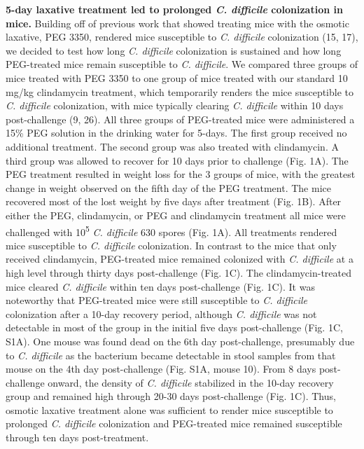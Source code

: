 \documentclass[
  11pt,
]{article}
\begin{document}
\textbf{5-day laxative treatment led to prolonged \emph{C. difficile}
colonization in mice.} Building off of previous work that showed
treating mice with the osmotic laxative, PEG 3350, rendered mice
susceptible to \emph{C. difficile} colonization (15, 17), we decided to
test how long \emph{C. difficile} colonization is sustained and how long
PEG-treated mice remain susceptible to \emph{C. difficile}. We compared
three groups of mice treated with PEG 3350 to one group of mice treated
with our standard 10 mg/kg clindamycin treatment, which temporarily
renders the mice susceptible to \emph{C. difficile} colonization, with
mice typically clearing \emph{C. difficile} within 10 days
post-challenge (9, 26). All three groups of PEG-treated mice were
administered a 15\% PEG solution in the drinking water for 5-days. The
first group received no additional treatment. The second group was also
treated with clindamycin. A third group was allowed to recover for 10
days prior to challenge (Fig. 1A). The PEG treatment resulted in weight
loss for the 3 groups of mice, with the greatest change in weight
observed on the fifth day of the PEG treatment. The mice recovered most
of the lost weight by five days after treatment (Fig. 1B). After either
the PEG, clindamycin, or PEG and clindamycin treatment all mice were
challenged with 10\textsuperscript{5} \emph{C. difficile} 630 spores
(Fig. 1A). All treatments rendered mice susceptible to \emph{C.
difficile} colonization. In contrast to the mice that only received
clindamycin, PEG-treated mice remained colonized with \emph{C.
difficile} at a high level through thirty days post-challenge (Fig. 1C).
The clindamycin-treated mice cleared \emph{C. difficile} within ten days
post-challenge (Fig. 1C). It was noteworthy that PEG-treated mice were
still susceptible to \emph{C. difficile} colonization after a 10-day
recovery period, although \emph{C. difficile} was not detectable in most
of the group in the initial five days post-challenge (Fig. 1C, S1A). One
mouse was found dead on the 6th day post-challenge, presumably due to
\emph{C. difficile} as the bacterium became detectable in stool samples
from that mouse on the 4th day post-challenge (Fig. S1A, mouse 10). From
8 days post-challenge onward, the density of \emph{C. difficile}
stabilized in the 10-day recovery group and remained high through 20-30
days post-challenge (Fig. 1C). Thus, osmotic laxative treatment alone
was sufficient to render mice susceptible to prolonged \emph{C.
difficile} colonization and PEG-treated mice remained susceptible
through ten days post-treatment.
\end{document}

